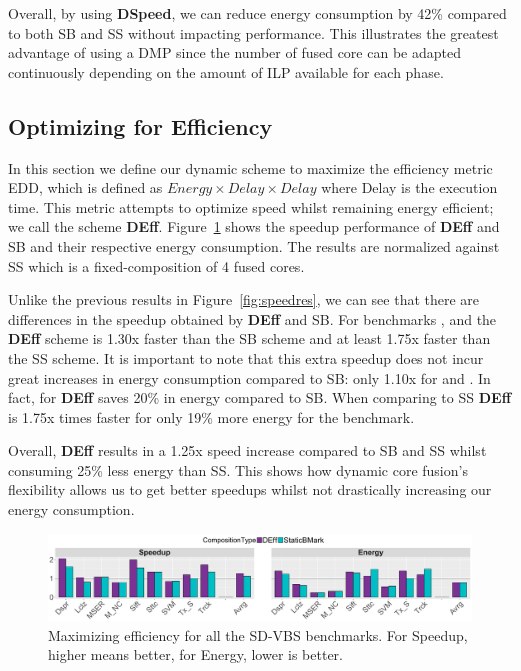 Overall, by using \textbf{DSpeed}, we can reduce energy consumption by 42\% compared to both SB and SS without impacting performance.
This illustrates the greatest advantage of using a DMP since the number of fused core can be adapted continuously depending on the amount of ILP available for each phase.

\subsection{Optimizing for Efficiency}

In this section we define our dynamic scheme to maximize the efficiency metric EDD, which is defined as $Energy \times Delay \times Delay$ where Delay is the execution time.
This metric attempts to optimize speed whilst remaining energy efficient; we call the scheme \textbf{DEff}.
Figure~\ref{fig:effres} shows the speedup performance of \textbf{DEff} and SB and their respective energy consumption.
The results are normalized against SS which is a fixed-composition of 4 fused cores.

Unlike the previous results in Figure~\ref{fig:speedres}, we can see that there are differences in the speedup obtained by \textbf{DEff} and SB.
For benchmarks ,  and  the \textbf{DEff} scheme is 1.30x faster than the SB scheme and at least 1.75x faster than the SS scheme.
It is important to note that this extra speedup does not incur great increases in energy consumption compared to SB: only 1.10x for  and .
In fact, for  \textbf{DEff} saves 20\% in energy compared to SB.
When comparing to SS \textbf{DEff} is 1.75x times faster for only 19\% more energy for the  benchmark.

Overall, \textbf{DEff} results in a 1.25x speed increase compared to SB and SS whilst consuming 25\% less energy than SS.
This shows how dynamic core fusion's flexibility allows us to get better speedups whilst not drastically increasing our energy consumption.

\begin{figure}[t]
    \centering
    \includegraphics[width=1\textwidth]{graphics/results/edd_bars.pdf}
\vspace*{-8mm}
    \caption{Maximizing efficiency for all the SD-VBS benchmarks. For Speedup, higher means better, for Energy, lower is better.}
    \label{fig:effres}
\vspace{5mm}
\end{figure}




